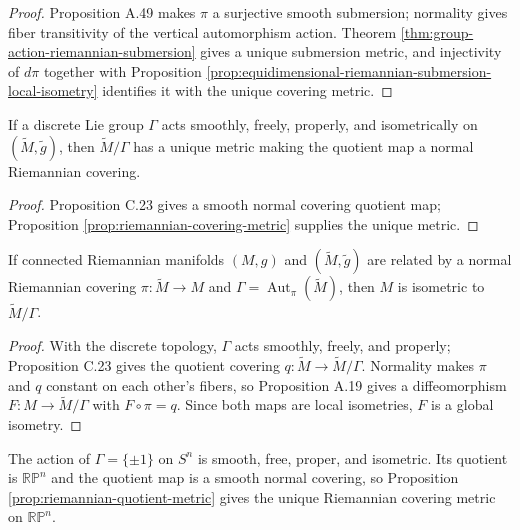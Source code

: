 \begin{proof}

\sketch Proposition A.49 makes $\pi$ a surjective smooth submersion; normality gives fiber transitivity of the vertical automorphism action. Theorem \ref{thm:group-action-riemannian-submersion} gives a unique submersion metric, and injectivity of $d\pi$ together with Proposition \ref{prop:equidimensional-riemannian-submersion-local-isometry} identifies it with the unique covering metric.
\end{proof}

\begin{proposition}
\label{prop:riemannian-quotient-metric}

If a discrete Lie group $\Gamma$ acts smoothly, freely, properly, and isometrically on $(\widetilde M,\tilde g)$, then $\widetilde M/\Gamma$ has a unique metric making the quotient map a normal Riemannian covering.
\end{proposition}

\begin{proof}
\sketch Proposition C.23 gives a smooth normal covering quotient map; Proposition \ref{prop:riemannian-covering-metric} supplies the unique metric.
\end{proof}

\begin{corollary}
\label{cor:isometric-to-quotient}

If connected Riemannian manifolds $(M,g)$ and $(\widetilde M,\tilde g)$ are related by a normal Riemannian covering $\pi:\widetilde M\to M$ and $\Gamma=\operatorname{Aut}_\pi(\widetilde M)$, then $M$ is isometric to $\widetilde M/\Gamma$.
\end{corollary}

\begin{proof}
\sketch With the discrete topology, $\Gamma$ acts smoothly, freely, and properly; Proposition C.23 gives the quotient covering $q:\widetilde M\to\widetilde M/\Gamma$. Normality makes $\pi$ and $q$ constant on each other's fibers, so Proposition A.19 gives a diffeomorphism $F:M\to\widetilde M/\Gamma$ with $F\circ\pi=q$. Since both maps are local isometries, $F$ is a global isometry.
\end{proof}

\begin{example}
\label{ex:real-projective-space-metric}

The action of $\Gamma=\{\pm1\}$ on $S^n$ is smooth, free, proper, and isometric. Its quotient is $\mathbb{RP}^n$ and the quotient map is a smooth normal covering, so Proposition \ref{prop:riemannian-quotient-metric} gives the unique Riemannian covering metric on $\mathbb{RP}^n$.
\end{example}

